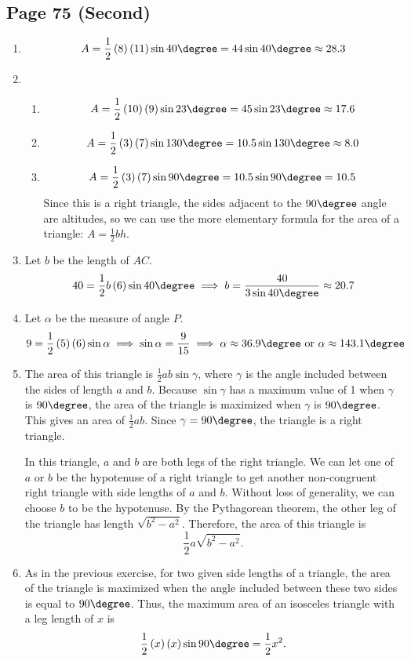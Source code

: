 \documentclass{article}
\newenvironment{solutions}[1]
{\subsection*{#1}
 \begin{enumerate}[leftmargin=1.5em]}
{\end{enumerate}}
\newcommand{\solution}{\item}
\newenvironment{subsolutions}
{\begin{enumerate}}
{\end{enumerate}}
\newcommand{\subsolution}{\item}
\begin{document}
\begin{solutions}{Page 75 (Second)}
\solution %
\[
A = \dfrac{1}{2}\left(8\right)\left(11\right)\sin{40\degree} = 44\sin{40\degree} \approx 28.3
\]

\solution %
\begin{subsolutions}
\subsolution %
\[
A = \dfrac{1}{2}\left(10\right)\left(9\right)\sin{23\degree} = 45\sin{23\degree} \approx 17.6
\]

\subsolution %
\[
A = \dfrac{1}{2}\left(3\right)\left(7\right)\sin{130\degree} = 10.5\sin{130\degree} \approx 8.0
\]

\subsolution %
\[
A = \dfrac{1}{2}\left(3\right)\left(7\right)\sin{90\degree} = 10.5\sin{90\degree} = 10.5
\]
Since this is a right triangle, the sides adjacent to the $90\degree$ angle are altitudes, so we can use the more elementary formula for the area of a triangle: $A=\tfrac{1}{2}bh$.
\end{subsolutions}

\solution %
Let $b$ be the length of $AC$.
\[
40=\dfrac{1}{2}b\left(6\right)\sin{40\degree} \implies b = \dfrac{40}{3\sin{40\degree}} \approx 20.7
\]

\solution %
Let $\alpha$ be the measure of angle $P$.
\[
9=\dfrac{1}{2}\left(5\right)\left(6\right)\sin{\alpha} \implies \sin{\alpha} = \dfrac{9}{15} \implies \alpha \approx 36.9\degree \text{ or } \alpha \approx 143.1\degree
\]

\solution %
The area of this triangle is $\tfrac{1}{2}ab\sin{\gamma}$, where $\gamma$ is the angle included between the sides of length $a$ and $b$. Because $\sin{\gamma}$ has a maximum value of 1 when $\gamma$ is $90\degree$, the area of the triangle is maximized when $\gamma$ is $90\degree$. This gives an area of $\tfrac{1}{2}ab$. Since $\gamma=90\degree$, the triangle is a right triangle.

In this triangle, $a$ and $b$ are both legs of the right triangle. We can let one of $a$ or $b$ be the hypotenuse of a right triangle to get another non-congruent right triangle with side lengths of $a$ and $b$. Without loss of generality, we can choose $b$ to be the hypotenuse. By the Pythagorean theorem, the other leg of the triangle has length $\sqrt{b^2-a^2}$. Therefore, the area of this triangle is
\[
\dfrac{1}{2}a\sqrt{b^2-a^2}.
\]

\solution %
As in the previous exercise, for two given side lengths of a triangle, the area of the triangle is maximized when the angle included between these two sides is equal to $90\degree$. Thus, the maximum area of an isosceles triangle with a leg length of $x$ is
\[
\dfrac{1}{2}\left(x\right)\left(x\right)\sin{90\degree} = \dfrac{1}{2}x^{2}.
\]


\end{solutions}
\end{document}
